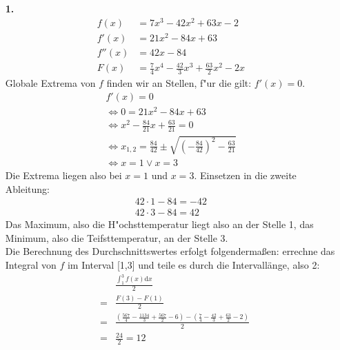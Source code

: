 \documentclass[a4paper,11pt]{article}
\title{\titleinfo}
\author{\authorinfotitle}
\date{\today}
\begin{document}
\maketitle
    \begin{enumerate}
        \item[\textbf{1.}]
            \begin{align*}
                f(x)&=7x^3-42x^2+63x-2\\
                f'(x)&=21x^2-84x+63\\
                f''(x)&=42x-84\\
                F(x)&= \frac{7}{4}x^4-\frac{42}{3}x^3+\frac{63}{2}x^2-2x
            \end{align*}
            Globale Extrema von $f$ finden wir an Stellen, f"ur die gilt: $f'(x)=0$.
            \begin{align*}
                f'(x)=0 \\
                \Leftrightarrow 0=21x^2-84x+63 \\
                \Leftrightarrow x^2-\frac{84}{21}x+\frac{63}{21}=0 \\
                \Leftrightarrow x_{1,2}=\frac{84}{42} \pm \sqrt{\left(- \frac{84}{42}\right)^2-\frac{63}{21}} \\
                \Leftrightarrow x = 1 \vee x=3
            \end{align*}
            Die Extrema liegen also bei $x=1$ und $x=3$. Einsetzen in die zweite Ableitung:
            \begin{align*}
                42 \cdot 1 - 84=-42 \\
                42 \cdot 3 - 84=42
            \end{align*}
            Das Maximum, also die H"ochsttemperatur liegt also an der Stelle 1, das Minimum, also die Teifsttemperatur, an der Stelle 3.\\
            Die Berechnung des Durchschnittswertes erfolgt folgendermaßen: errechne das Integral von $f$ im Interval [1,3] und teile es durch die
            Intervallänge, also 2:
            \begin{align*}
                &&\frac{\int_1^3 f(x) \mathrm{d}x}{2} \\
                &=& \frac{F(3)-F(1)}{2} \\
                &=& \frac{(\frac{567}{4}-\frac{1134}{3}+\frac{567}{2}-6)-(\frac{7}{4}-\frac{42}{3}+\frac{63}{2}-2)}{2} \\
                &=& \frac{24}{2}=12
            \end{align*}

\end{enumerate}
\end{document}
